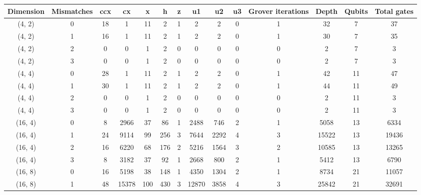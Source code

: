 \begin{tabular}{|c|c||c|c|c|c|c|c|c|c||c|c|c|c|}
\toprule
Dimension & Mismatches & ccx &      cx &   x &     h & z &      u1 &    u2 & u3 & Grover iterations &   Depth & Qubits & Total gates \\
\midrule
   (4, 2) &          0 &  18 &       1 &  11 &     2 & 1 &       2 &     2 &  0 &                 1 &      32 &      7 &          37 \\
   (4, 2) &          1 &  16 &       1 &  11 &     2 & 1 &       2 &     2 &  0 &                 1 &      30 &      7 &          35 \\
   (4, 2) &          2 &   0 &       0 &   1 &     2 & 0 &       0 &     0 &  0 &                 0 &       2 &      7 &           3 \\
   (4, 2) &          3 &   0 &       0 &   1 &     2 & 0 &       0 &     0 &  0 &                 0 &       2 &      7 &           3 \\
   (4, 4) &          0 &  28 &       1 &  11 &     2 & 1 &       2 &     2 &  0 &                 1 &      42 &     11 &          47 \\
   (4, 4) &          1 &  30 &       1 &  11 &     2 & 1 &       2 &     2 &  0 &                 1 &      44 &     11 &          49 \\
   (4, 4) &          2 &   0 &       0 &   1 &     2 & 0 &       0 &     0 &  0 &                 0 &       2 &     11 &           3 \\
   (4, 4) &          3 &   0 &       0 &   1 &     2 & 0 &       0 &     0 &  0 &                 0 &       2 &     11 &           3 \\
  (16, 4) &          0 &   8 &    2966 &  37 &    86 & 1 &    2488 &   746 &  2 &                 1 &    5058 &     13 &        6334 \\
  (16, 4) &          1 &  24 &    9114 &  99 &   256 & 3 &    7644 &  2292 &  4 &                 3 &   15522 &     13 &       19436 \\
  (16, 4) &          2 &  16 &    6220 &  68 &   176 & 2 &    5216 &  1564 &  3 &                 2 &   10585 &     13 &       13265 \\
  (16, 4) &          3 &   8 &    3182 &  37 &    92 & 1 &    2668 &   800 &  2 &                 1 &    5412 &     13 &        6790 \\
  (16, 8) &          0 &  16 &    5198 &  38 &   148 & 1 &    4350 &  1304 &  2 &                 1 &    8734 &     21 &       11057 \\
  (16, 8) &          1 &  48 &   15378 & 100 &   430 & 3 &   12870 &  3858 &  4 &                 3 &   25842 &     21 &       32691 \\

\end{tabular}
